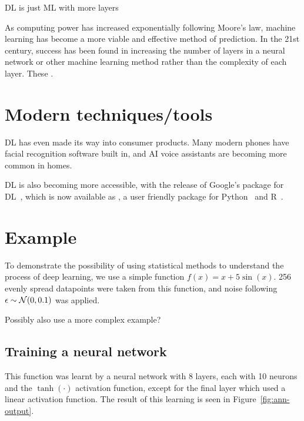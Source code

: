 \begin{todo}
	DL is just ML with more layers
\end{todo}

As computing power has increased exponentially following Moore's law, machine learning has become a more viable and effective method of prediction.
In the 21st century, success has been found in increasing the number of layers in a neural network or other machine learning method rather than the complexity of each layer.
These  .

\section{Modern techniques/tools}

\ac{DL} has even made its way into consumer products.
Many modern phones have facial recognition software built in, and \ac{AI} voice assistants are becoming more common in homes.

\ac{DL} is also becoming more accessible, with the release of Google's  package for \ac{DL}~\autocite{abadi2016}, which is now available as , a user friendly package for Python~\autocite{chollet2015} and R~\autocite{allaire2018}.

\section{Example}

To demonstrate the possibility of using statistical methods to understand the process of deep learning, we use a simple function \(f(x) = x + 5 \sin(x)\).
256 evenly spread datapoints were taken from this function, and noise following \(\epsilon \sim \mathcal{N}(0, 0.1)\) was applied.

\begin{todo}
Possibly also use a more complex example?
\end{todo}

\subsection{Training a neural network}

This function was learnt by a neural network with 8 layers, each with 10 neurons and the \(\tanh(\cdot)\) activation function, except for the final layer which used a linear activation function.
The result of this learning is seen in Figure~\ref{fig:ann-output}.

